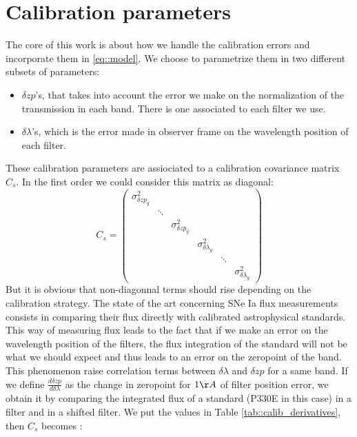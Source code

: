 \documentclass[\docopts]{\docclass}
\begin{document}
\section{Calibration parameters}
\label{sec::calib_uncertainties}
The core of this work is about how we handle the calibration errors and incorporate them in \ref{eq::model}.
We choose to parametrize them in two different subsets of parameters:
\begin{itemize}
\item $\delta zp$'s, that takes into account the error we make on the normalization of the transmission in each band.
There is one associated to each filter we use.
\item $\delta \lambda$'s, which is the error made in observer frame on the wavelength position of each filter. 
\end{itemize}
These calibration parameters are assiociated to a calibration covariance matrix $C_s$.
In the first order we could consider this matrix as diagonal:
\begin{equation}
C_s = 
\begin{pmatrix}
   \sigma^2_{\delta zp_{g}} & \ & \ & \ & \ & \ \\
   \ & \ddots & \ & \ & \ & \ \\
   \ & \ & \sigma^2_{\delta zp_{y}} & \ & \ & \ \\
   \ & \ & \ & \sigma^2_{\delta\lambda_{g}} & \ & \ \\
   \ & \ & \ & \ & \ddots & \ \\
   \ & \ & \ & \ & \ & \sigma^2_{\delta\lambda_{y}}
\end{pmatrix}
\end{equation}
But it is obvious that non-diagonnal terms should rise depending on the calibration strategy.
The state of the art concerning SNe Ia flux measurements consists in comparing their flux directly with calibrated astrophysical standards.
This way of measuring flux leads to the fact that if we make an error on the wavelength position of the filters, the flux integration of the standard will not be what we should expect and thus leads to an error on the zeropoint of the band.
This phenomenon raise correlation terms between $\delta \lambda$ and $\delta zp$ for a same band.
If we define $\frac{d \delta zp}{d \delta \lambda}$ as the change in zeropoint for $1 \AA$ of filter position error, we obtain it by comparing the integrated flux of a standard (P330E in this case) in a filter and in a shifted filter.
We put the values in Table \ref{tab::calib_derivatives}, then $C_s$ becomes :
\end{document}
